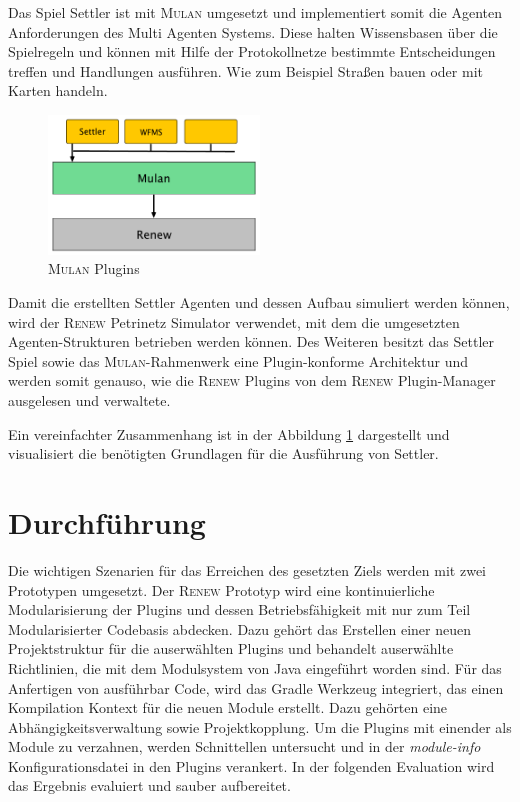 		Das Spiel Settler ist mit \textsc{Mulan} umgesetzt und implementiert somit die Agenten Anforderungen des Multi Agenten Systems. Diese halten Wissensbasen über die Spielregeln und können mit Hilfe der Protokollnetze bestimmte Entscheidungen treffen und Handlungen ausführen. Wie zum Beispiel Straßen bauen oder mit Karten handeln.\bigbreak
		
		\begin{figure}[h!]
		  \centering
		  \includegraphics[width=0.5\textwidth]{material/images/settler-mulan-renew.pdf}
		  \caption{\textsc{Mulan} Plugins}
		  \label{fig:mulan_plugin}
		\end{figure}

		Damit die erstellten Settler Agenten und dessen Aufbau simuliert werden können, wird der \textsc{Renew} Petrinetz Simulator verwendet, mit dem die umgesetzten Agenten-Strukturen betrieben werden können.\newline
		Des Weiteren besitzt das Settler Spiel sowie das \textsc{Mulan}-Rahmenwerk eine Plugin-konforme Architektur und werden somit genauso, wie die \textsc{Renew} Plugins von dem \textsc{Renew} Plugin-Manager ausgelesen und verwaltete.\bigbreak

		Ein vereinfachter Zusammenhang ist in der Abbildung \ref{fig:mulan_plugin} dargestellt und visualisiert die benötigten Grundlagen für die Ausführung von Settler.

\section{Durchführung} \label{sec:durchführung}
	Die wichtigen Szenarien für das Erreichen des gesetzten Ziels werden mit zwei Prototypen umgesetzt. Der \textsc{Renew} Prototyp wird eine kontinuierliche  Modularisierung der Plugins und dessen Betriebsfähigkeit mit nur zum Teil Modularisierter Codebasis abdecken. Dazu gehört das Erstellen einer neuen Projektstruktur für die auserwählten Plugins und behandelt auserwählte Richtlinien, die mit dem Modulsystem von Java eingeführt worden sind. Für das Anfertigen von ausführbar Code, wird das Gradle Werkzeug integriert, das einen Kompilation Kontext für die neuen Module erstellt. Dazu gehörten eine Abhängigkeitsverwaltung sowie Projektkopplung. Um die Plugins mit einender als Module zu verzahnen, werden Schnittellen untersucht und in der \textit{module-info} Konfigurationsdatei in den Plugins verankert. In der folgenden Evaluation wird das Ergebnis evaluiert und sauber aufbereitet.\bigbreak 

